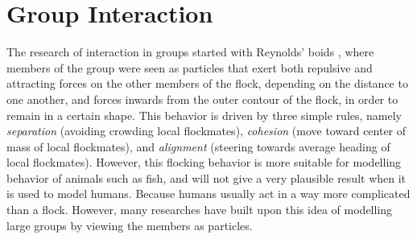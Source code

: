 \documentclass[11pt]{book}
\begin{document}
\section{Group Interaction}
The research of interaction in groups started with Reynolds' boids \cite{Reynolds87flocks} , where members of the group were seen as particles that exert both repulsive and attracting forces on the other members of the flock, depending on the distance to one another, and forces inwards from the outer contour of the flock, in order to remain in a certain shape.  This behavior is driven by three simple rules, namely \emph{separation} (avoiding crowding local flockmates), \emph{cohesion} (move toward center of mass of local flockmates), and \emph{alignment} (steering towards average heading of local flockmates). However, this flocking behavior is more suitable for modelling behavior of animals such as fish, and will not give a very plausible result when it is used to model humans. Because humans usually act in a way more complicated than a flock. However, many researches have built upon this idea of modelling large groups by viewing the members as particles.
\end{document}
